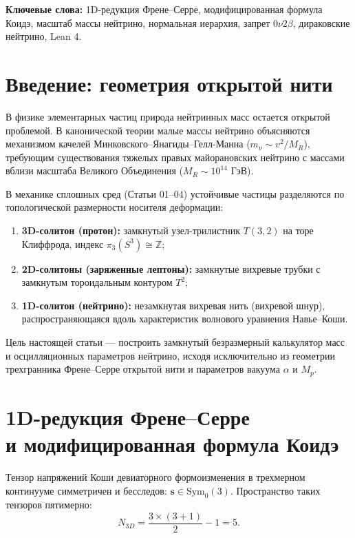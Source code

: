 \documentclass[11pt,a4paper]{article}
\theoremstyle{definition}
\theoremstyle{remark}
\begin{document}
\vspace{2mm}
\noindent\textbf{Ключевые слова:} 1D-редукция Френе--Серре, модифицированная формула Коидэ, масштаб массы нейтрино, нормальная иерархия, запрет $0\nu 2\beta$, дираковские нейтрино, Lean 4.

\section{Введение: геометрия открытой нити}
В физике элементарных частиц природа нейтринных масс остается открытой проблемой. В канонической теории малые массы нейтрино объясняются механизмом качелей Минковского--Янагиды--Гелл-Манна ($m_\nu \sim v^2 / M_R$), требующим существования тяжелых правых майорановских нейтрино с массами вблизи масштаба Великого Объединения ($M_R \sim 10^{14}\text{ ГэВ}$).

В механике сплошных сред (Статьи 01--04) устойчивые частицы разделяются по топологической размерности носителя деформации:
\begin{enumerate}
    \item \textbf{3D-солитон (протон):} замкнутый узел-трилистник $T(3,2)$ на торе Клиффрода, индекс $\pi_3(S^3) \cong \mathbb{Z}$;
    \item \textbf{2D-солитоны (заряженные лептоны):} замкнутые вихревые трубки с замкнутым тороидальным контуром $T^2$;
    \item \textbf{1D-солитон (нейтрино):} незамкнутая вихревая нить (вихревой шнур), распространяющаяся вдоль характеристик волнового уравнения Навье--Коши.
\end{enumerate}

Цель настоящей статьи — построить замкнутый безразмерный калькулятор масс и осцилляционных параметров нейтрино, исходя исключительно из геометрии трехгранника Френе--Серре открытой нити и параметров вакуума $\alpha$ и $M_p$.

\section{1D-редукция Френе--Серре\\ и модифицированная формула Коидэ}
Тензор напряжений Коши девиаторного формоизменения в трехмерном континууме симметричен и бесследов: $\mathbf{s} \in \mathrm{Sym}_0(3)$. Пространство таких тензоров пятимерно:
\begin{equation}
    N_{3D} = \frac{3 \times (3 + 1)}{2} - 1 = 5.
\end{equation}
\end{document}
